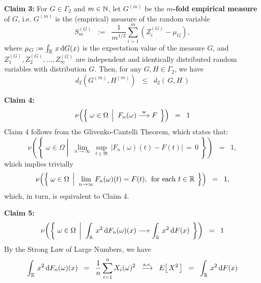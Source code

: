 \mbox{}
\vskip 0.5cm
\noindent
\textbf{Claim 3:}\; For $G \in \Gamma_{2}$ and $m \in \N$,
let $G^{(m)}$ be the \textbf{$m$-fold empirical measure} of $G$, i.e.
$G^{(m)}$ is the (empirical) measure of the random variable
\begin{equation*}
S_{m}^{(G)} \;\; := \;\; \dfrac{1}{m^{1/2}} \sum_{i=1}^{m}\left(Z_{i}^{(G)} - \mu_{G}\right),
\end{equation*}
where $\mu_{G} := \int_{\Re}\,x\,\d G(x)$ is the expectation value of the measure $G$,
and $Z^{(G)}_{1},Z^{(G)}_{2},\ldots,Z^{(G)}_{m}$ are independent and
identically distributed random variables with distribution $G$.
Then, for any $G, H \in \Gamma_{2}$, we have
\begin{equation*}
d_{2}\!\left(G^{(m)},H^{(m)}\right)
\;\; \leq \;\;
d_{2}\!\left(\,G,H\,\right)
\end{equation*}

\mbox{}
\vskip 0.5cm
\noindent
\textbf{Claim 4:}\;
\begin{equation*}
\nu\!\left(\left\{\;
\omega \in \Omega
\;\left\vert\;\;
F_{n}(\omega) \overset{\textnormal{w}}{\longrightarrow} F
\right.
\;\right\}\right)
\;\; = \;\;
1
\end{equation*}
Claim 4 follows from the Glivenko-Cantelli Theorem, which states that:
\begin{equation*}
\nu\!\left(\left\{\;
\omega \in \Omega
\;\left\vert\;\;
\lim_{n\rightarrow\infty}\,\sup_{t \in \Re}\,\left\vert F_{n}(\omega)(t) - F(t) \right\vert \,=\, 0
\right.
\;\right\}\right)
\;\; = \;\;
1,
\end{equation*}
which implies trivially
\begin{equation*}
\nu\!\left(\left\{\;
\omega \in \Omega
\;\left\vert\;\;
\lim_{n\rightarrow\infty}F_{n}(\omega)(t) = F(t),
\;\,\textnormal{for each $t\in\Re$}
\right.
\;\right\}\right)
\;\; = \;\;
1,
\end{equation*}
which, in turn, is equivalent to Claim 4.

\mbox{}
\vskip 0.5cm
\noindent
\textbf{Claim 5:}\;
\begin{equation*}
\nu\!\left(\left\{\;
\omega \in \Omega
\;\left\vert\;\;
\int_{\Re}\,x^{2}\,\d F_{n}(\omega)(x) \longrightarrow \int_{\Re}\,x^{2}\,\d F(x)
\right.
\;\right\}\right)
\;\; = \;\;
1
\end{equation*}
By the Strong Law of Large Numbers, we have
\begin{equation*}
\int_{\Re}\,x^{2}\,\d F_{n}(\omega)(x)
\;\; = \;\; \dfrac{1}{n}\sum_{i=1}^{n}X_{i}(\omega)^{2}
\;\; \overset{\textnormal{a.e.}}{\longrightarrow} \;\; E\!\left[\,X^{2}\,\right]
\;\; = \;\; \int_{\Re}\,x^{2}\,\d F(x)
\end{equation*}

